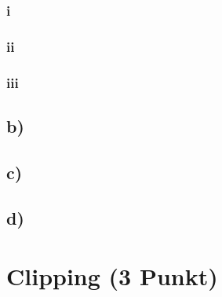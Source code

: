 \documentclass[a4paper,10pt,DIV=14]{article}
\begin{document}
\subsubsection{i}
\subsubsection{ii}
\subsubsection{iii}

\subsection{b)}
\subsection{c)}
\subsection{d)}

\section{Clipping (3 Punkt)}
\end{document}
